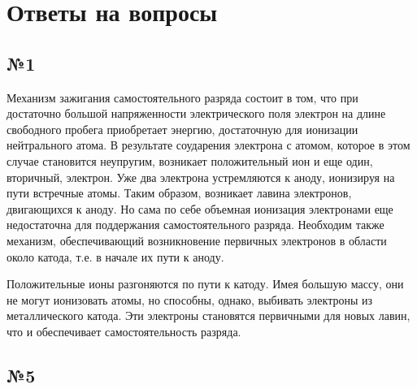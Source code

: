 \section{Ответы на вопросы}
\subsection{№1}
Механизм зажигания самостоятельного разряда состоит в том, что при достаточно большой напряженности электрического поля электрон на длине свободного пробега приобретает энергию, достаточную для ионизации нейтрального атома. В результате соударения электрона с атомом, которое в этом случае становится неупругим, возникает положительный ион и еще один, вторичный, электрон. Уже два электрона устремляются к аноду, ионизируя на пути встречные атомы. Таким образом, возникает лавина электронов, двигающихся к аноду. Но сама по себе объемная ионизация электронами еще недостаточна для поддержания самостоятельного разряда. Необходим также механизм, обеспечивающий возникновение первичных электронов в области около катода, т.е. в начале их пути к аноду. 

Положительные ионы разгоняются по пути к катоду. Имея большую массу, они не могут ионизовать атомы, но способны, однако, выбивать электроны из металлического катода. Эти электроны становятся первичными для новых лавин, что и обеспечивает самостоятельность разряда.
\subsection{№5}


